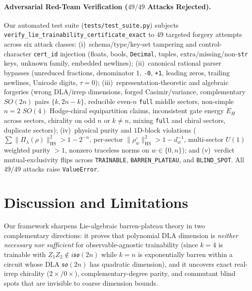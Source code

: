 \documentclass[11pt,a4paper]{article}
\theoremstyle{definition}
\theoremstyle{remark}
\newcommand{\HS}{\mathrm{HS}}
\newcommand{\so}{\mathfrak{so}}
\begin{document}
\paragraph{Adversarial Red-Team Verification ($49/49$ Attacks Rejected).}
Our automated test suite (\texttt{tests/test\_suite.py}) subjects \texttt{verify\_lie\_\allowbreak trainability\_\allowbreak certificate\_exact} to $49$ targeted forgery attempts across six attack classes: (i)~schema/type/key-set tampering and control-character \texttt{cert\_id} injection (floats, bools, \texttt{Decimal}, tuples, extra/missing/non-\texttt{str} keys, unknown family, embedded newlines); (ii)~canonical rational parser bypasses (unreduced fractions, denominator $1$, \texttt{-0}, \texttt{+1}, leading zeros, trailing newlines, Unicode digits, $\tau = 0$); (iii)~representation-theoretic and algebraic forgeries (wrong DLA/irrep dimensions, forged Casimir/variance, complementary $SO(2n)$ pairs $\{k, 2n-k\}$, reducible even-$n$ \texttt{full} middle sectors, non-simple $n=2$ $SO(4)$ Hodge-chiral equipartition claims, inconsistent gate energy $E_H$ across sectors, chirality on odd $n$ or $k \ne n$, mixing \texttt{full} and chiral sectors, duplicate sectors); (iv)~physical purity and $1$D-block violations ($\sum \|\Pi_\lambda(\rho)\|_{\HS}^2 > 1-2^{-n}$, per-sector $\|\rho_w^\circ\|_{\HS}^2 > 1-d_w^{-1}$, multi-sector $U(1)$ weighted purity $>1$, nonzero traceless norms on $w \in \{0, n\}$); and (v)~verdict mutual-exclusivity flips across \texttt{TRAINABLE}, \texttt{BARREN\_PLATEAU}, and \texttt{BLIND\_SPOT}. All $49/49$ attacks raise \texttt{ValueError}.

\section{Discussion and Limitations}

Our framework sharpens Lie-algebraic barren-plateau theory in two complementary directions: it proves that polynomial DLA dimension is \emph{neither necessary nor sufficient} for observable-agnostic trainability (since $k=4$ is trainable with $Z_1 Z_2 \notin i\so(2n)$ while $k=n$ is exponentially barren within a circuit whose DLA $\so(2n)$ has quadratic dimension), and it uncovers exact real-irrep chirality ($2\times / 0\times$), complementary-degree parity, and commutant blind spots that are invisible to coarse dimension bounds.
\end{document}
